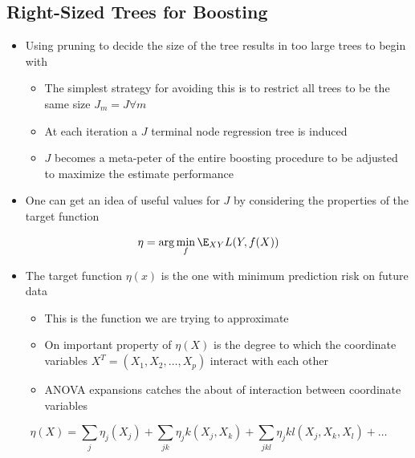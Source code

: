 \documentclass[11pt]{article}
\begin{document}
\subsection{Right-Sized Trees for Boosting}
\label{sec:orgd5e1a34}
\begin{itemize}
\item Using pruning to decide the size of the tree results in too large trees to begin with
\begin{itemize}
\item The simplest strategy for avoiding this is to restrict all trees to be the same size \(J_m = J \forall m\)
\item At each iteration a \(J\) terminal node regression tree is induced
\item \(J\) becomes a meta-peter of the entire boosting procedure to be adjusted to maximize the estimate performance
\end{itemize}

\item One can get an idea of useful values for \(J\) by considering the properties of the target function
\end{itemize}
\begin{equation}
  \eta = \arg \min_f \E_{XY} L(Y,f(X))
\end{equation}
\begin{itemize}
\item The target function \(\eta(x)\) is the one with minimum prediction risk on future data
\begin{itemize}
\item This is the function we are trying to approximate
\item On important property of \(\eta(X)\) is the degree to which the coordinate variables \(X^T=(X_1,X_2, \dots, X_p)\) interact with each other
\item ANOVA expansions catches the about of interaction between coordinate variables
\end{itemize}
\end{itemize}
\begin{equation}
  \eta(X) = \sum_j \eta_j(X_j) + \sum_{jk} \eta_jk (X_j, X_k) + \sum_{jkl} \eta_jkl (X_j, X_k, X_l) + \dots
\end{equation}
\end{document}
